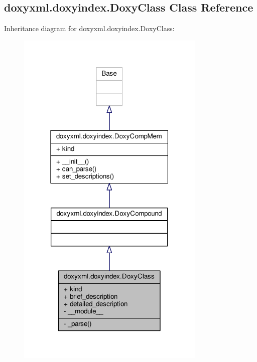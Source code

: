 \subsection{doxyxml.\+doxyindex.\+Doxy\+Class Class Reference}
\label{classdoxyxml_1_1doxyindex_1_1DoxyClass}


Inheritance diagram for doxyxml.\+doxyindex.\+Doxy\+Class\+:
\nopagebreak
\begin{figure}[H]
\begin{center}
\leavevmode
\includegraphics[width=255pt]{d1/dd9/classdoxyxml_1_1doxyindex_1_1DoxyClass__inherit__graph}
\end{center}
\end{figure}


